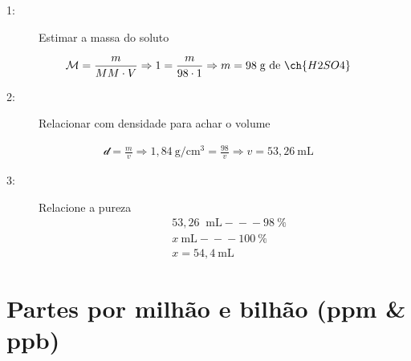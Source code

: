 \documentclass[presentation,professionalfonts,aspectratio=169]{beamer}
\begin{document}
\begin{frame}[label={sec:org95c9ae7}]{}
\begin{answer}[print=true]
\scriptsize
\begin{description}
\item[{1:}] Estimar a massa do soluto
\end{description}
\begin{align*}
\mathcal{M}=\frac{m}{MM \cdot V} \Rightarrow 1 = \frac{m}{98 \cdot 1 } \Rightarrow m = 98 \; \text{g de}~ \ch{H2SO4}
\end{align*}
\begin{description}
\item[{2:}] Relacionar com densidade para achar o volume
\end{description}
\begin{align*}
\mathcal{d}=\frac{m}{v} \Rightarrow 1,84 ~\text{g/cm$^3$}=\frac{98}{v} \Rightarrow v=53,26 ~\text{mL}  
\end{align*}
\begin{description}
\item[{3:}] Relacione a pureza
\begin{align*}
& 53,26~\text{ mL} -\!\!\!-\!\!\!- 98~\text{\%}\\
& x~\text{mL} -\!\!\!-\!\!\!- 100~\text{\%}\\
& x= 54,4 ~\text{mL}
\end{align*}
\end{description}
\end{answer}
\end{frame}


\section{Partes por milhão e bilhão (ppm \& ppb)}
\label{sec:org67af945}
\end{document}
